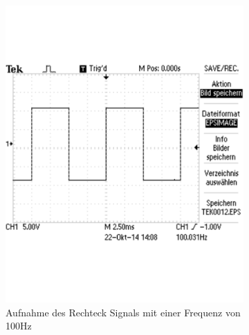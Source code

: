\documentclass[12pt,a4paper]{article}
\begin{document}
\begin{figure}[H]
        \centering
        \begin{subfigure}[b]{0.28\textwidth}
                \includegraphics[width=\textwidth , scale = 0.4]{2_2_rech_100hz.pdf}
                \caption[Aufnahme des Rechtecksignals mit einer Frequenz von 100Hz]{Aufnahme des Rechteck Signals mit einer Frequenz von 100Hz}
                \label{fig:2_2_rech_100hz}
        \end{subfigure}%
        ~ %
        \hfill
        \begin{subfigure}[b]{0.28\textwidth}

\end{subfigure}
\end{figure}
\end{document}
